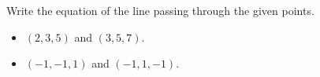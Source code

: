 Write the equation of the line passing through the given points.

\begin{itemize}
\item $(2,3,5)$ and $(3,5,7)$.

\item $(-1,-1,1)$ and $(-1,1,-1)$.
\end{itemize}